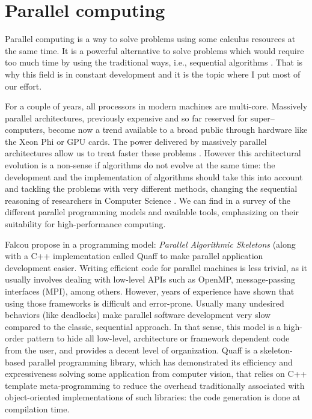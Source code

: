 
\section{Parallel computing}
\label{sec:parallel}

Parallel computing is a way to solve problems using some calculus resources at the same time. It is a powerful alternative to solve problems which would require too much time by using the traditional ways, i.e., sequential algorithms \cite{Grama2003}. That is why this field is in constant development and it is the topic where I put most of our effort. 

For a couple of years, all processors in modern machines are multi-core. Massively parallel architectures, previously expensive and so far reserved for super--computers, become now a trend available to a broad public through hardware like the Xeon Phi or GPU cards. The power delivered by massively parallel architectures allow us to treat faster these problems \cite{Borkar2007}. However this architectural evolution is a non-sense if algorithms do not evolve at the same time: the development and the implementation of algorithms should take this into account and tackling the problems with very different methods, changing the sequential reasoning of researchers in Computer Science \cite{Hill2008, Sanders2014}. We can find in \cite{Diaz2012} a survey of the different parallel programming models and available tools, emphasizing on their suitability for high-performance computing.

Falcou propose in \cite{Falcou2009} a programming model: \textit{Parallel Algorithmic Skeletons} (along with a C++ implementation called {\sc Quaff} to make parallel application development easier. Writing efficient code for parallel machines is less trivial, as it usually involves dealing with low-level APIs such as OpenMP, message-passing interfaces (MPI), among others. However, years of experience have shown that using those frameworks is difficult and error-prone. Usually many undesired behaviors (like deadlocks) make parallel software development very slow compared to the classic, sequential approach. In that sense, this model is a high-order pattern to hide all low-level, architecture or framework dependent code from the user, and provides a decent level of organization. {\sc Quaff} is a skeleton-based parallel programming library, which has demonstrated its efficiency and expressiveness solving some application from computer vision, that relies on C++ template meta-programming to reduce the overhead traditionally associated with object-oriented implementations of such libraries: the code generation is done at compilation time.

